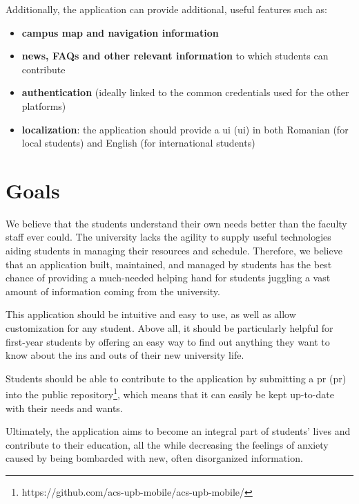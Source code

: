     Additionally, the application can provide additional, useful features such as:
    
    \begin{itemize}
        \setlength{\topsep}{0.5pt}
        \setlength{\itemsep}{0.5pt}
        \setlength{\parsep}{0.5pt}
        \item \textbf{campus map and navigation information}
        \item \textbf{news, FAQs and other relevant information} to which students can contribute
        \item \textbf{authentication} (ideally linked to the common credentials used for the other platforms)
        \item \textbf{localization}: the application should provide a \acrshort{ui} (\acrlong{ui}) in both Romanian (for local students) and English (for international students)
    \end{itemize}

\section{Goals} \label{1:goals}

    We believe that the students understand their own needs better than the faculty staff ever could. The university lacks the agility to supply useful technologies aiding students in managing their resources and schedule. Therefore, we believe that an application built, maintained, and managed by students has the best chance of providing a much-needed helping hand for students juggling a vast amount of information coming from the university.
    
    This application should be intuitive and easy to use, as well as allow customization for any student. Above all, it should be particularly helpful for first-year students by offering an easy way to find out anything they want to know about the ins and outs of their new university life.
    
    Students should be able to contribute to the application by submitting a \acrshort{pr} (\acrlong{pr}) into the public repository\footnote{https://github.com/acs-upb-mobile/acs-upb-mobile/}, which means that it can easily be kept up-to-date with their needs and wants.
    
    Ultimately, the application aims to become an integral part of students' lives and contribute to their education, all the while decreasing the feelings of anxiety caused by being bombarded with new, often disorganized information.

